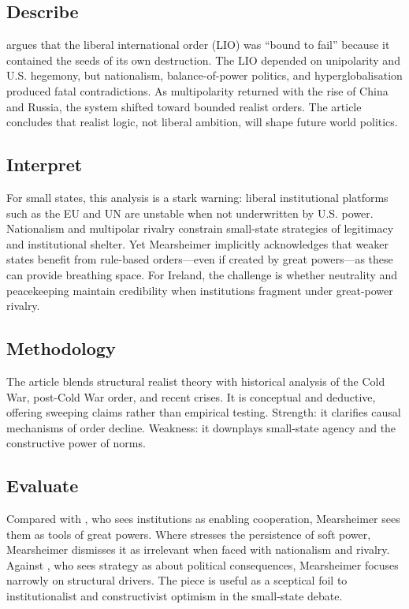 \subsection*{Describe}
\textcite{MEARSHEIMER_2019} argues that the liberal international order (LIO) was “bound to fail” because it contained the seeds of its own destruction. The LIO depended on unipolarity and U.S. hegemony, but nationalism, balance-of-power politics, and hyperglobalisation produced fatal contradictions. As multipolarity returned with the rise of China and Russia, the system shifted toward bounded realist orders. The article concludes that realist logic, not liberal ambition, will shape future world politics.

\subsection*{Interpret}
For small states, this analysis is a stark warning: liberal institutional platforms such as the EU and UN are unstable when not underwritten by U.S. power. Nationalism and multipolar rivalry constrain small-state strategies of legitimacy and institutional shelter. Yet Mearsheimer implicitly acknowledges that weaker states benefit from rule-based orders—even if created by great powers—as these can provide breathing space. For Ireland, the challenge is whether neutrality and peacekeeping maintain credibility when institutions fragment under great-power rivalry.

\subsection*{Methodology}
The article blends structural realist theory with historical analysis of the Cold War, post-Cold War order, and recent crises. It is conceptual and deductive, offering sweeping claims rather than empirical testing. Strength: it clarifies causal mechanisms of order decline. Weakness: it downplays small-state agency and the constructive power of norms.

\subsection*{Evaluate}
Compared with \textcite{KEOHANE_1988}, who sees institutions as enabling cooperation, Mearsheimer sees them as tools of great powers. Where \textcite{NYE_2008} stresses the persistence of soft power, Mearsheimer dismisses it as irrelevant when faced with nationalism and rivalry. Against \textcite{GRAY_2018}, who sees strategy as about political consequences, Mearsheimer focuses narrowly on structural drivers. The piece is useful as a sceptical foil to institutionalist and constructivist optimism in the small-state debate.


